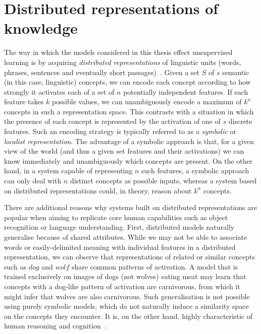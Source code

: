 \section{Distributed representations of knowledge} The way in which the models considered in this thesis effect unsupervised learning is by acquiring \emph{distributed representations} of linguistic units (words, phrases, sentences and eventually short passages)~\citep{hinton1986learning}. Given a set \(S\) of \(s\) semantic (in this case, linguistic) concepts, we can encode each concept according to how strongly it activates each of a set of \(n\) potentially independent features. If each feature takes \(k\) possible values, we can unambiguously encode a maximum of \(k^n\) concepts in such a representation space. This contrasts with a situation in which the presence of each concept is represented by the activation of one of \(s\) discrete features. Such an encoding strategy is typically referred to as a \emph{symbolic} or \emph{localist representation}. The advantage of a symbolic approach is that, for a given view of the world (and thus a given set features and their activations) we can know immediately and unambiguously which concepts are present. On the other hand, in a system capable of representing \(n\) such features, a symbolic approach can only deal with \(n\) distinct concepts as possible inputs, whereas a system based on distributed representations could, in theory, reason about \(k^n\) concepts. 

There are additional reasons why systems built on distributed representations are popular when aiming to replicate core human capabilities such as object recognition or language understanding. First, distributed models naturally generalise because of shared attributes. While we may not be able to associate words or easily-delimited meaning with individual features in a distributed representation, we can observe that representations of related or similar concepts such as \(dog\) and \(wolf\) share common patterns of activation. A model that is trained exclusively on images of dogs (not wolves) eating meat may learn that concepts with a dog-like pattern of activation are carnivorous, from which it might infer that wolves are also carnivorous. Such generalisation is not possible using purely symbolic models, which do not naturally induce a similarity space on the concepts they encounter. It is, on the other hand, highly characteristic of human reasoning and cognition~\citep{rosch1976basic}. 

